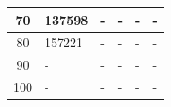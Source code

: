 \begin{table}[htp]
\begin{tabular}{|c|l|l|l|l|l|}
70                                                                         & 137598                               & -                                     & -                                     & -                                     & -                                     \\ \hline
80                                                                         & 157221                               & -                                     & -                                     & -                                     & -                                     \\ \hline
90                                                                         & -                                    & -                                     & -                                     & -                                     & -                                     \\ \hline
100                                                                        & -                                    & -                                     & -                                     & -                                     & -                                     \\ \hline
\end{tabular}
\end{table}


